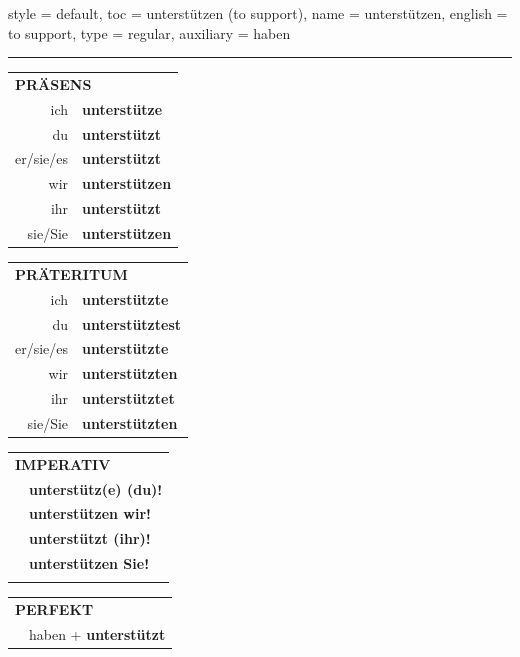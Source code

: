 \begin{verbentry}{
  style = {default},
  toc = {unterstützen (to support)},
  name = {unterstützen},
  english = {to support},
  type = {regular},
  auxiliary = {haben}
}
 
    
     \vspace{5pt}

    \hrule
    
    \vspace{5pt}

  \begin{tabular}{rl}
     \multicolumn{2}{l}{\textbf{PRÄSENS} }\\
    ich & \textbf{unterstütze}\\
    du & \textbf{unterstützt}\\
    er/sie/es & \textbf{unterstützt}\\
    wir & \textbf{unterstützen}\\
    ihr & \textbf{unterstützt}\\
    sie/Sie & \textbf{unterstützen}\\
  \end{tabular}
  \hfill
     \begin{tabular}{rl}
    \multicolumn{2}{l}{\textbf{PRÄTERITUM} }\\
    ich & \textbf{unterstützte}\\
    du & \textbf{unterstütztest}\\
    er/sie/es & \textbf{unterstützte}\\
    wir & \textbf{unterstützten}\\
    ihr & \textbf{unterstütztet}\\
    sie/Sie & \textbf{unterstützten}\\
  \end{tabular}
  \hfill
  \begin{tabular}{rl}
     \multicolumn{2}{l}{\textbf{IMPERATIV} }\\
   & \textbf{unterstütz(e) (du)!}\\
   & \textbf{unterstützen wir!}\\
   & \textbf{unterstützt (ihr)!}\\
   & \textbf{unterstützen Sie!}\\
   & \vspace{10pt}
  \end{tabular}

    \vspace{10pt}

 \begin{tabular}{rl}
     \multicolumn{2}{l}{\textbf{PERFEKT}}\\
   & haben + \textbf{unterstützt}\\
  \end{tabular}
\hfill
   \begin{tabular}{rl}
   

\end{tabular}
\end{verbentry}
